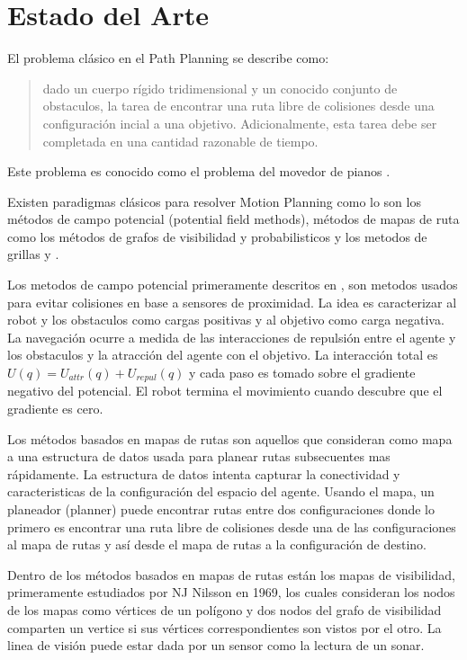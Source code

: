 \section{Estado del Arte}

El problema cl\'asico en el Path Planning se describe como:
\begin{quote}
dado un cuerpo r\'igido tridimensional y un conocido conjunto de obstaculos, la tarea de encontrar una ruta libre de colisiones desde una configuraci\'on incial a una objetivo. Adicionalmente, esta tarea debe ser completada en una cantidad razonable de tiempo.
\end{quote}
Este problema es conocido como el problema del movedor de pianos \cite{Swartz83}.

Existen paradigmas cl\'asicos para resolver Motion Planning como lo son los m\'etodos de campo potencial (potential field methods), m\'etodos de mapas de ruta como los m\'etodos de grafos de visibilidad y probabilisticos y los metodos de grillas \cite{Wang03} y \cite{Zhuang04} .

Los metodos de campo potencial primeramente descritos en \cite{Kathib85}, son metodos usados para evitar colisiones en base a sensores de proximidad. La idea es caracterizar al robot y los obstaculos como cargas positivas y al objetivo como carga negativa. La navegaci\'on ocurre a medida de las interacciones de repulsi\'on entre el agente y los obstaculos y la atracci\'on del agente con el objetivo. La interacci\'on total es $U(q) = U_{attr}(q) + U_{repul}(q)$ y cada paso es tomado sobre el gradiente negativo del potencial. El robot termina el movimiento cuando descubre que el gradiente es cero.

Los m\'etodos basados en mapas de rutas son aquellos que consideran como mapa a una estructura de datos usada para planear rutas subsecuentes mas r\'apidamente. La estructura de datos intenta capturar la conectividad y caracteristicas de la configuraci\'on del espacio del agente. Usando el mapa, un planeador (planner) puede encontrar rutas entre dos configuraciones donde lo primero es encontrar una ruta libre de colisiones desde una de las configuraciones al mapa de rutas y as\'i desde el mapa de rutas a la configuraci\'on de destino.

Dentro de los m\'etodos basados en mapas de rutas est\'an los mapas de visibilidad, primeramente estudiados por NJ Nilsson en 1969, los cuales consideran los nodos de los mapas como v\'ertices de un pol\'igono y dos nodos del grafo de visibilidad comparten un vertice si sus v\'ertices correspondientes son vistos por el otro. La linea de visi\'on puede estar dada por un sensor como la lectura de un sonar.

